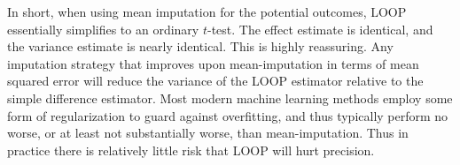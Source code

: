 In short, when using mean imputation for the potential outcomes, LOOP essentially simplifies to an ordinary $t$-test.  The effect estimate is identical, and the variance estimate is nearly identical.  This is highly reassuring.  Any imputation strategy that improves upon mean-imputation in terms of mean squared error will reduce the variance of the LOOP estimator relative to the simple difference estimator.  Most modern machine learning methods employ some form of regularization to guard against overfitting, and thus typically perform no worse, or at least not substantially worse, than mean-imputation.  Thus in practice there is relatively little risk that LOOP will hurt precision.








